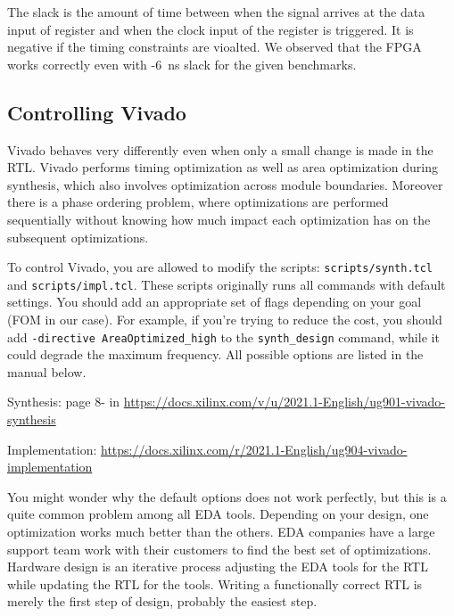 The slack is the amount of time between when the signal arrives at the data input of register and when the clock input of the register is triggered.
It is negative if the timing constraints are vioalted.
We observed that the FPGA works correctly even with -6~ns slack for the given benchmarks.


\subsection{Controlling Vivado}
Vivado behaves very differently even when only a small change is made in the RTL.
Vivado performs timing optimization as well as area optimization during synthesis, which also involves optimization across module boundaries.
Moreover there is a phase ordering problem, where optimizations are performed sequentially without knowing how much impact each optimization has on the subsequent optimizations.

To control Vivado, you are allowed to modify the scripts: \verb|scripts/synth.tcl| and \verb|scripts/impl.tcl|.
These scripts originally runs all commands with default settings.
You should add an appropriate set of flags depending on your goal (FOM in our case).
For example, if you're trying to reduce the cost, you should add \verb|-directive AreaOptimized_high| to the \verb|synth_design| command, while it could degrade the maximum frequency.
All possible options are listed in the manual below.

Synthesis: page 8- in \url{https://docs.xilinx.com/v/u/2021.1-English/ug901-vivado-synthesis}

Implementation: \url{https://docs.xilinx.com/r/2021.1-English/ug904-vivado-implementation}

You might wonder why the default options does not work perfectly, but this is a quite common problem among all EDA tools.
Depending on your design, one optimization works much better than the others.
EDA companies have a large support team work with their customers to find the best set of optimizations.
Hardware design is an iterative process adjusting the EDA tools for the RTL while updating the RTL for the tools.
Writing a functionally correct RTL is merely the first step of design, probably the easiest step.


\newpage
